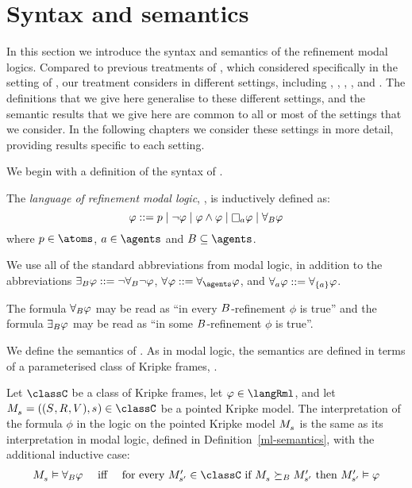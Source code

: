 \section{Syntax and semantics}\label{rml-semantics}

In this section we introduce the syntax and semantics of the refinement modal logics.
Compared to previous treatments of \logicRml{}, which considered \logicRml{} specifically in the setting of \classK{}, our treatment considers \logicRml{} in different settings, including \classK{}, \classKFF{}, \classKD{}, \classS{}, and \classKF{}.
The definitions that we give here generalise to these different settings, and the semantic results that we give here are common to all or most of the settings that we consider.
In the following chapters we consider these settings in more detail, providing results specific to each setting.

\pagebreak

We begin with a definition of the syntax of \logicRml{}.

\begin{definition}
The {\em language of refinement modal logic}, \langRml{}, is inductively defined as:
$$
\phi ::= 
    \atomP \mid
    \lnot \phi \mid
    \phi \land \phi \mid
    \necessaryA \phi \mid
    \allrefsBs \phi
$$
where $\atomP \in \atoms$, $\agentA \in \agents$ and $\agentsB \subseteq \agents$.
\end{definition}

We use all of the standard abbreviations from modal logic, in addition to the abbreviations $\somerefsBs \phi ::= \lnot \allrefsBs \lnot \phi$, $\allrefs \phi ::= \allrefsAs \phi$, and $\allrefsA \phi ::= \allrefs[\{\agentA\}] \phi$.

The formula $\allrefsBs \phi$ may be read as ``in every $\agentsB$-refinement $\phi$ is true'' and the formula $\somerefsBs \phi$ may be read as ``in some $\agentsB$-refinement $\phi$ is true''.

We define the semantics of \logicRml{}.
As in modal logic, the semantics are defined in terms of a parameterised class of Kripke frames, \classC{}.

\begin{definition}
Let $\classC$ be a class of Kripke frames, let $\phi \in \langRml$, and let $\kPModelAndTuple{\kStateS} \in \classC$ be a pointed Kripke model.
The interpretation of the formula $\phi$ in the logic \logicRmlC{} on the pointed Kripke model $\kPModel{\kStateS}$ is the same as its interpretation in modal logic, defined in Definition~\ref{ml-semantics}, with the additional inductive case:
$$
\begin{array}{lcl}
    \kPModel{\kStateS} \entails \allrefsBs \phi & \text{ iff } & \text{for every } \kPModelP{\kStateSP} \in \classC \text{ if } \kPModel{\kStateS} \simulatesBs \kPModelP{\kStateSP} \text{ then } \kPModelP{\kStateSP} \entails \phi
\end{array}
$$
\end{definition}

